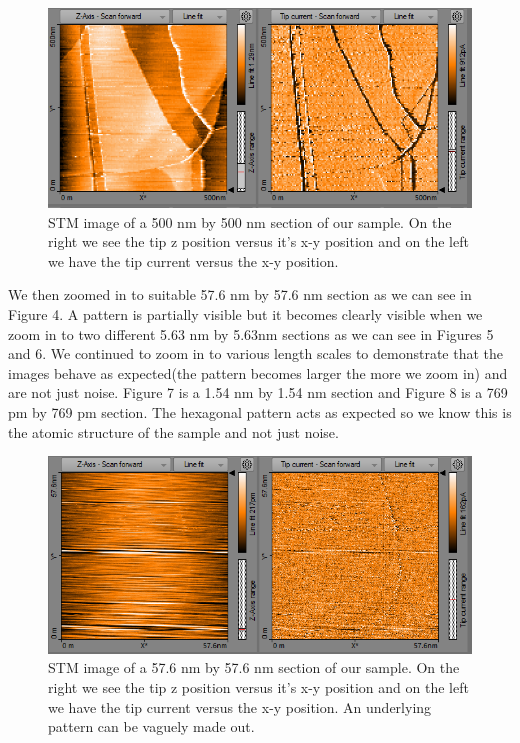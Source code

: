 \documentclass{article}
\begin{document}
\begin{figure}[H]
\includegraphics[scale=.7,center]{STM500nm2.PNG}
\caption{STM image of a 500 nm by 500 nm section of our sample.  On the right we see the tip z position versus it's x-y position and on the left we have the tip current versus the x-y position.}
\end{figure}

We then zoomed in to suitable 57.6 nm by 57.6 nm section as we can see in Figure 4.  A pattern is partially visible but it becomes clearly visible when we zoom in to two different 5.63 nm by 5.63nm sections as we can see in Figures 5 and 6.  We continued to zoom in to various length scales to demonstrate that the images behave as expected(the pattern becomes larger the more we zoom in) and are not just noise.  Figure 7 is a 1.54 nm by 1.54 nm section and Figure 8 is a 769 pm by 769 pm section. The hexagonal pattern acts as expected so we know this is the atomic structure of the sample and not just noise.  

\begin{figure}[H]
\includegraphics[scale=.7,center]{STM57d6nm2.PNG}
\caption{STM image of a 57.6 nm by 57.6 nm section of our sample.  On the right we see the tip z position versus it's x-y position and on the left we have the tip current versus the x-y position. An underlying pattern can be vaguely made out.}
\end{figure}
\end{document}
